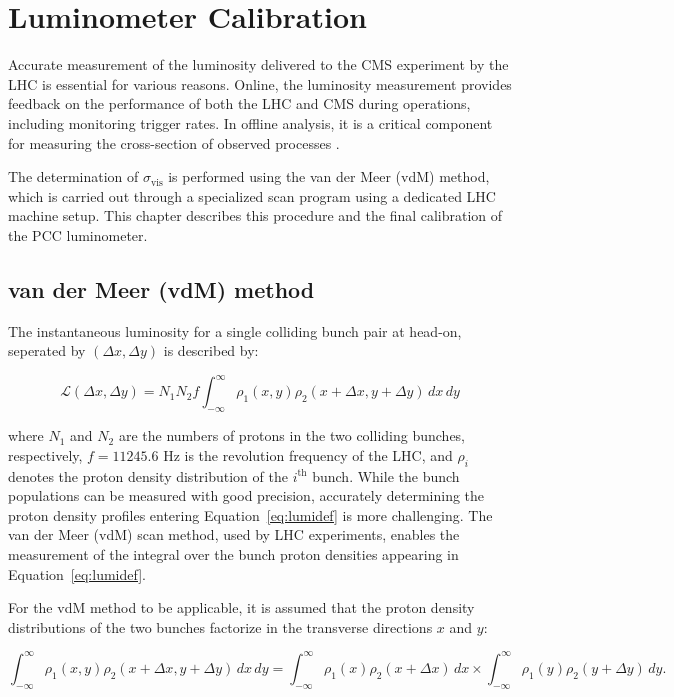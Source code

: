 \chapter{Luminometer Calibration}
\label{ch3}


Accurate measurement of the luminosity delivered to the CMS experiment by the LHC is essential for various reasons. Online, the luminosity measurement provides feedback on the performance of both the LHC and CMS during operations, including monitoring trigger rates. In offline analysis, it is a critical component for measuring the cross-section of observed processes \cite{pas_18}.  

The determination of \( \sigma_{\text{vis}} \) is performed using the van der Meer (vdM) method, which is carried out through a specialized scan program using a dedicated LHC machine setup. This chapter describes this procedure and the final calibration of the PCC luminometer.


\section{van der Meer (vdM) method}
\label{vdM method}

The instantaneous luminosity for a single colliding bunch pair at head-on, seperated by $(\Delta x, \Delta y)$ is described by:


\begin{equation}
\label{eq:lumidef}
\mathcal{L} (\Delta x, \Delta y) = N_1 N_2 f\int_{-\infty}^{\infty}\rho_1(x,y)\rho_2(x+\Delta x,y+\Delta y) \,dx\,dy
\end{equation}


where $N_1$ and $N_2$ are the numbers of protons in the two colliding bunches, respectively, $f = 11245.6$ Hz is the revolution frequency of the LHC, and $\rho_i$ denotes the proton density distribution of the $i^{\text{th}}$ bunch. While the bunch populations can be measured with good precision, accurately determining the proton density profiles entering Equation~\ref{eq:lumidef} is more challenging. The van der Meer (vdM) scan method, used by LHC experiments, enables the measurement of the integral over the bunch proton densities appearing in Equation~\ref{eq:lumidef}.

For the vdM method to be applicable, it is assumed that the proton density distributions of the two bunches factorize in the transverse directions $x$ and $y$:

\begin{equation}
\label{eq:fact}
\int_{-\infty}^{\infty} \rho_1(x,y) \rho_2(x+\Delta x, y+\Delta y) \, dx \, dy = \int_{-\infty}^{\infty} \rho_1(x) \rho_2(x+\Delta x) \, dx  \times  \int_{-\infty}^{\infty} \rho_1(y) \rho_2(y+\Delta y) \, dy.
\end{equation}


